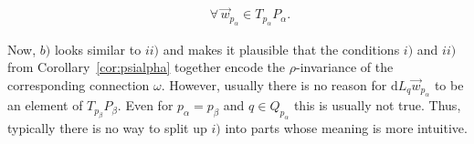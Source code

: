 \begin{Remark}
\begin{enumerate}
\begin{enumerate}
\begin{gather*}
\qquad\forall\, \vec{w}_{p_\alpha}\in T_{p_\alpha}P_\alpha.
\end{gather*}
\end{enumerate}
Now, $b)$ looks similar to $ii)$ and makes it plausible that the conditions
$i)$ and $ii)$ from Corollary~\ref{cor:psialpha} together encode the $\rho$-invariance of the corresponding
connection $\omega$.
However, usually there is no reason for $\mathrm{d} L_q \vec{w}_{p_\alpha}$ to be an element of $T_{p_\beta}P_\beta$.
Even for $p_\alpha=p_\beta$ and $q\in Q_{p_\alpha}$ this is usually not true.
Thus, typically there is no way to split up $i)$ into parts whose meaning is more intuitive.
\end{enumerate}
\end{Remark}
